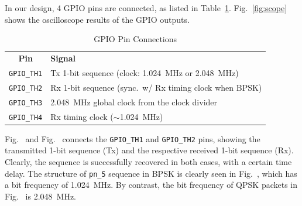 \documentclass[journal,twoside]{IEEEtran}
\begin{document}
    In our design, 4 GPIO pins are connected, as listed in Table~\ref{tab:gpio_pins}.
    Fig.~\ref{fig:scope} shows the oscilloscope results of the GPIO outputs.
    \begin{table}[htbp]
      \caption{GPIO Pin Connections}
      \label{tab:gpio_pins}
      \renewcommand{\arraystretch}{1.2}
      \begin{tabularx}{\linewidth}{cX}
        \toprule\tabvertspace
        \textbf{Pin} & \textbf{Signal} \\
        \tabvertspace\midrule
        \texttt{GPIO\_TH1} & Tx 1-bit sequence (clock: \qty{1.024}{MHz} or \qty{2.048}{MHz}) \\
        \texttt{GPIO\_TH2} & Rx 1-bit sequence (sync.\ w/ Rx timing clock when BPSK) \\
        \texttt{GPIO\_TH3} & \qty{2.048}{MHz} global clock from the clock divider \\
        \texttt{GPIO\_TH4} & Rx timing clock ($\sim$\qty{1.024}{MHz}) \\
        \bottomrule
      \end{tabularx}
    \end{table}

    Fig.~ and Fig.~
    connects the \texttt{GPIO\_TH1} and \texttt{GPIO\_TH2} pins,
    showing the transmitted 1-bit sequence (Tx) and the respective received 1-bit sequence (Rx).
    Clearly, the sequence is successfully recovered in both cases, with a certain time delay.
    The structure of \texttt{pn\_5} sequence in BPSK is clearly seen in Fig.~,
    which has a bit frequency of \qty{1.024}{MHz}.
    By contrast, the bit frequency of QPSK packets in Fig.~ is \qty{2.048}{MHz}.

\end{document}
